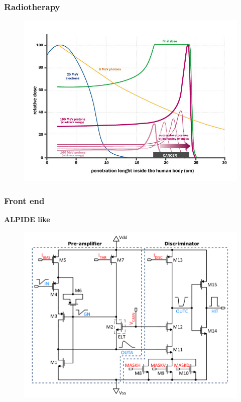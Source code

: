     \begin{frame}[noframenumbering]
        \frametitle{Radiotherapy}
        \begin{figure}[h!]
            \centering
            \includegraphics[width=.8\linewidth]{figures/pixel_detectors_usage/Bragg-Peak.png}
        \end{figure}
    \end{frame} 


    \begin{frame}[noframenumbering]
        \frametitle{Front end}
            \textbf{ALPIDE like}
            \begin{figure}[h!]
                \centering
                \includegraphics[width=.8\linewidth]{figures/Monopix1/Monopix1_FE_circuit.png}        
            \end{figure}
    \end{frame}     

